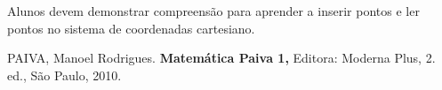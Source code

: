 \documentclass[oneside,a4paper,12pt]{article}
\begin{document}
  Alunos devem demonstrar compreensão para aprender a inserir pontos e ler pontos no sistema de coordenadas cartesiano.




\begin{thebibliography}{}

PAIVA, Manoel Rodrigues.
\newblock \textbf{Matemática Paiva 1,}
\newblock Editora: Moderna Plus, 2. ed., São Paulo, 2010.

\end{thebibliography}
\end{document}
